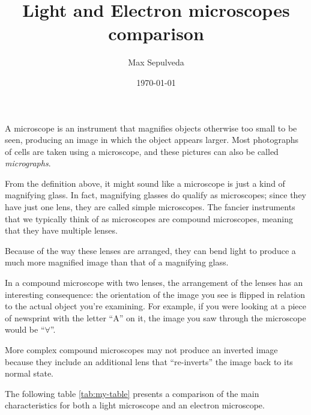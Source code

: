 \documentclass[12pt,letterpaper,final]{article}
\title{Light and Electron microscopes comparison}
\date{\today}
\author{Max Sepulveda}
\begin{document}
\maketitle

A microscope is an instrument that magnifies objects otherwise too small to be seen, producing an image in which the object appears larger. Most photographs of cells are taken using a microscope, and these pictures can also be called \emph{micrographs}.

From the definition above, it might sound like a microscope is just a kind of magnifying glass. In fact, magnifying glasses do qualify as microscopes; since they have just one lens, they are called simple microscopes. The fancier instruments that we typically think of as microscopes are compound microscopes, meaning that they have multiple lenses. 

Because of the way these lenses are arranged, they can bend light to produce a much more magnified image than that of a magnifying glass.

In a compound microscope with two lenses, the arrangement of the lenses has an interesting consequence: the orientation of the image you see is flipped in relation to the actual object you’re examining. For example, if you were looking at a piece of newsprint with the letter ``A'' on it, the image you saw through the microscope would be ``$\forall$''. 

More complex compound microscopes may not produce an inverted image because they include an additional lens that “re-inverts” the image back to its normal state.
 
\bigskip

The following table \ref{tab:my-table} presents a comparison of the main characteristics for both a light microscope and an electron microscope.
\end{document}
